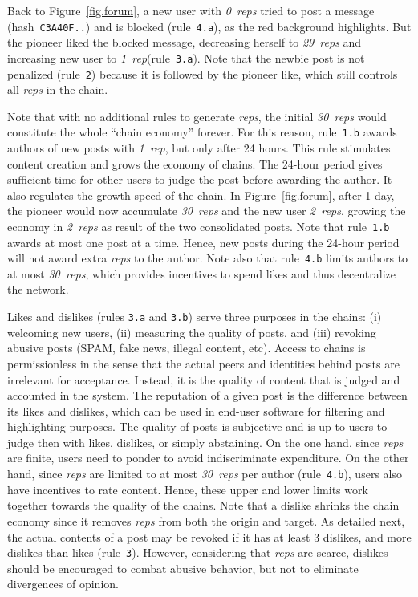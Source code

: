 \documentclass[10pt,journal,compsoc]{IEEEtran}
\newcommand{\reps}     {\emph{reps}\xspace}
\newcommand{\onerep}   {\emph{1~rep}\xspace}
\newcommand{\nreps}[1] {\emph{#1~reps\xspace}}
\newcommand{\code}[1]  {\texttt{\footnotesize{#1}}}
\begin{document}
Back to Figure~\ref{fig.forum}, a new user with \nreps{0} tried to post a
message (hash~\code{C3A40F..}) and is blocked (rule~\code{4.a}), as the red
background highlights.
But the pioneer liked the blocked message, decreasing herself to \nreps{29}
and increasing new user to \onerep (rule~\code{3.a}).
Note that the newbie post is not penalized (rule~\code{2}) because it is
followed by the pioneer like, which still controls all \reps in the chain.

Note that with no additional rules to generate \reps, the initial \nreps{30}
would constitute the whole ``chain economy'' forever.
For this reason, rule~\code{1.b} awards authors of new posts with \onerep,
but only after 24 hours.
This rule stimulates content creation and grows the economy of chains.
The 24-hour period gives sufficient time for other users to judge the post
before awarding the author.
It also regulates the growth speed of the chain.
In Figure~\ref{fig.forum}, after 1 day, the pioneer would now accumulate
\nreps{30} and the new user \nreps{2}, growing the economy in \nreps{2} as
result of the two consolidated posts.
Note that rule~\code{1.b} awards at most one post at a time.
Hence, new posts during the 24-hour period will not award extra \reps to the
author.
Note also that rule~\code{4.b} limits authors to at most \nreps{30}, which
provides incentives to spend likes and thus decentralize the network.

Likes and dislikes (rules \code{3.a} and \code{3.b}) serve three purposes
in the chains:
    (i) welcoming new users,
    (ii) measuring the quality of posts, and
    (iii) revoking abusive posts (SPAM, fake news, illegal content, etc).
%
Access to chains is permissionless in the sense that the actual peers and
identities behind posts are irrelevant for acceptance.
Instead, it is the quality of content that is judged and accounted in the
system.
%
The reputation of a given post is the difference between its likes and
dislikes, which can be used in end-user software for filtering and highlighting
purposes.
%
The quality of posts is subjective and is up to users to judge then with likes,
dislikes, or simply abstaining.
%
On the one hand, since \reps are finite, users need to ponder to avoid
indiscriminate expenditure.
On the other hand, since \reps are limited to at most \nreps{30} per author
(rule~\code{4.b}), users also have incentives to rate content.
Hence, these upper and lower limits work together towards the quality of the
chains.
%
Note that a dislike shrinks the chain economy since it removes \reps from both
the origin and target.
As detailed next, the actual contents of a post may be revoked if it has at
least 3 dislikes, and more dislikes than likes (rule~\code{3}).
However, considering that \reps are scarce, dislikes should be encouraged to
combat abusive behavior, but not to eliminate divergences of opinion.
\end{document}
